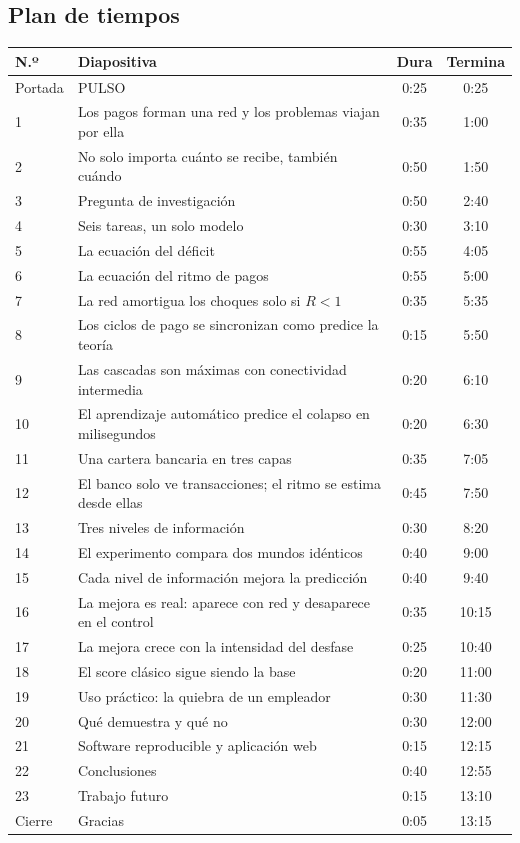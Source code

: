 \documentclass[11pt,a4paper,oneside]{article}
\begin{document}
\subsection{Plan de tiempos}
\begin{center}
\small
\begin{longtable}{lp{}cc}
\toprule
\textbf{N.º} & \textbf{Diapositiva} & \textbf{Dura} & \textbf{Termina} \\
\midrule
\endhead
Portada & PULSO & 0:25 & 0:25 \\
1 & Los pagos forman una red y los problemas viajan por ella & 0:35 & 1:00 \\
2 & No solo importa cuánto se recibe, también cuándo & 0:50 & 1:50 \\
3 & Pregunta de investigación & 0:50 & 2:40 \\
4 & Seis tareas, un solo modelo & 0:30 & 3:10 \\
5 & La ecuación del déficit & 0:55 & 4:05 \\
6 & La ecuación del ritmo de pagos & 0:55 & 5:00 \\
7 & La red amortigua los choques solo si $R<1$ & 0:35 & 5:35 \\
8 & Los ciclos de pago se sincronizan como predice la teoría & 0:15 & 5:50 \\
9 & Las cascadas son máximas con conectividad intermedia & 0:20 & 6:10 \\
10 & El aprendizaje automático predice el colapso en milisegundos & 0:20 & 6:30 \\
11 & Una cartera bancaria en tres capas & 0:35 & 7:05 \\
12 & El banco solo ve transacciones; el ritmo se estima desde ellas & 0:45 & 7:50 \\
13 & Tres niveles de información & 0:30 & 8:20 \\
14 & El experimento compara dos mundos idénticos & 0:40 & 9:00 \\
15 & Cada nivel de información mejora la predicción & 0:40 & 9:40 \\
16 & La mejora es real: aparece con red y desaparece en el control & 0:35 & 10:15 \\
17 & La mejora crece con la intensidad del desfase & 0:25 & 10:40 \\
18 & El score clásico sigue siendo la base & 0:20 & 11:00 \\
19 & Uso práctico: la quiebra de un empleador & 0:30 & 11:30 \\
20 & Qué demuestra y qué no & 0:30 & 12:00 \\
21 & Software reproducible y aplicación web & 0:15 & 12:15 \\
22 & Conclusiones & 0:40 & 12:55 \\
23 & Trabajo futuro & 0:15 & 13:10 \\
Cierre & Gracias & 0:05 & 13:15 \\
\bottomrule
\end{longtable}
\end{center}
\end{document}
